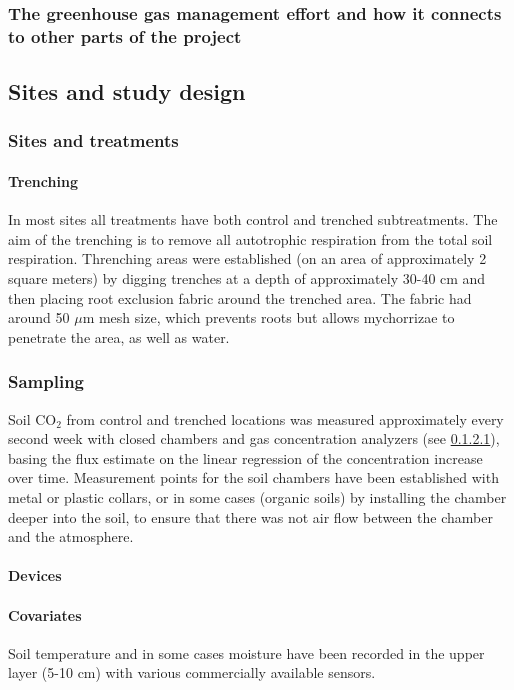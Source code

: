 \documentclass[12pt,a4paper]{article}
\begin{document}
\subsubsection{The greenhouse gas management effort and how it connects to other parts of the project}




\subsection{Sites and study design}

\subsubsection{Sites and treatments}

\paragraph{Trenching}
In most sites all treatments have both control and trenched subtreatments. The aim of the trenching is to remove all autotrophic respiration from the total soil respiration. Threnching areas were established (on an area of approximately 2 square meters) by digging trenches at a depth of approximately 30-40 cm and then placing root exclusion fabric around the trenched area. The fabric had around 50 $\mu$m mesh size, which prevents roots but allows mychorrizae to penetrate the area, as well as water.

\subsubsection{Sampling}
Soil CO$_2$ from control and trenched locations was measured approximately every second week with closed chambers and gas concentration analyzers (see \ref{par:devices}), basing the flux estimate on the linear regression of the concentration increase over time.
Measurement points for the soil chambers have been established with metal or plastic collars, or in some cases (organic soils) by installing the chamber deeper into the soil, to ensure that there was not air flow between the chamber and the atmosphere.

\paragraph{Devices}\label{par:devices}


\paragraph{Covariates}
Soil temperature and in some cases moisture have been recorded in the upper layer (5-10 cm) with various commercially available sensors.
\end{document}
